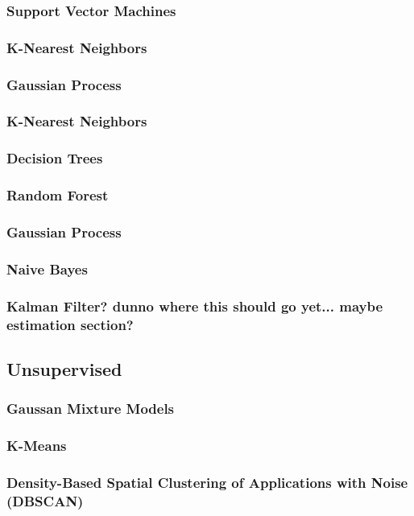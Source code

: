 \documentclass[11pt]{article}
\begin{document}
\subsubsection{Support Vector Machines}
\subsubsection{K-Nearest Neighbors}
\subsubsection{Gaussian Process}
\subsubsection{K-Nearest Neighbors}
\subsubsection{Decision Trees}
\subsubsection{Random Forest}
\subsubsection{Gaussian Process}
\subsubsection{Naive Bayes}
\subsubsection{Kalman Filter? dunno where this should go yet... maybe estimation section?}
\subsection{Unsupervised}
\subsubsection{Gaussan Mixture Models}
\subsubsection{K-Means}
\subsubsection{Density-Based Spatial Clustering of Applications with Noise (DBSCAN)}
\end{document}
